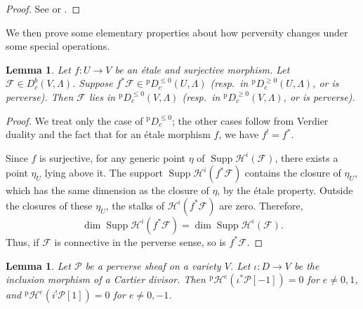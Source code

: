 \documentclass[english]{smfart}
\renewcommand{\leq}{\leqslant}
\renewcommand{\geq}{\geqslant}
\theoremstyle{remark}
\theoremstyle{plain}
\newtheorem{lemma}[remark]{Lemma}
\theoremstyle{definition}
\numberwithin{equation}{remark}
\theoremstyle{void}
\begin{document}
\begin{proof}
See \cite[Exposé~XIV,~3.1]{sga4} or
\cite[Théorème~4.1.1]{bbd}.
\end{proof}

We then prove some elementary properties about how perversity changes under
some special operations.

\begin{lemma}\label{lemma:check-connectivity}
Let \(f\colon U \to V\) be an étale and surjective morphism.  Let
\(\mathcal{F} \in D^b_c(V, \Lambda)\).  Suppose
\(f^{\ast}\mathcal{F} \in {}^{\mathrm{p}}D^{\leq 0}_c(U, \Lambda)\)
(resp.\ in \({}^{\mathrm{p}}D^{\geq 0}_c(U, \Lambda)\), or is perverse).
Then \(\mathcal{F}\) lies in \({}^{\mathrm{p}}D^{\leq 0}_c(V, \Lambda)\)
(resp.\ in \({}^{\mathrm{p}}D^{\geq 0}_c(V, \Lambda)\), or is perverse).
\end{lemma}

\begin{proof}
We treat only the case of \({}^{\mathrm{p}}D_c^{\leq 0}\); the other
cases follow from Verdier duality and the fact that for an étale
morphism \(f\), we have \(f^! = f^*\).

Since \(f\) is surjective, for any generic point \(\eta\) of
\(\operatorname{Supp} \mathcal{H}^i(\mathcal{F})\), there exists a
point \(\eta_U\) lying above it.  The support
\(\operatorname{Supp} \mathcal{H}^i(f^* \mathcal{F})\) contains the
closure of \(\eta_U\), which has the same dimension as the closure of
\(\eta\), by the étale property.  Outside the closures of these
\(\eta_U\), the stalks of \(\mathcal{H}^i(f^*\mathcal{F})\) are zero.
Therefore,
\[
\dim \operatorname{Supp} \mathcal{H}^i(f^*\mathcal{F})
= \dim \operatorname{Supp} \mathcal{H}^i(\mathcal{F}) .
\]
Thus, if \(\mathcal{F}\) is connective in the perverse sense, so is
\(f^*\mathcal{F}\).
\end{proof}


\begin{lemma}\label{lemma:estimate-perv-dergee}
Let \(\mathcal{P}\) be a perverse sheaf on a variety \(V\).  Let
\(\iota\colon D \to V\) be the inclusion morphism of a Cartier
divisor.  Then
\({}^{\mathrm{p}}\mathcal{H}^{e}(\iota^{\ast}\mathcal{P}[-1]) = 0\)
for \(e \neq 0,1\), and
\({}^{\mathrm{p}}\mathcal{H}^{e}(i^{!}\mathcal{P}[1]) = 0\) for
\(e \neq 0,-1\).
\end{lemma}
\end{document}
